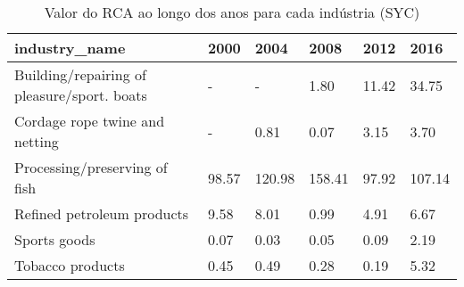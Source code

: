 \begin{table}
\centering
\caption{Valor do RCA ao longo dos anos para cada indústria (SYC)}
\begin{tabular}{p{6cm}p{1.5cm}p{1.5cm}p{1.5cm}p{1.5cm}p{1.5cm}}
\toprule
                              industry\_name &  2000 &   2004 &   2008 &  2012 &   2016 \\
\midrule
Building/repairing of pleasure/sport. boats &     - &      - &   1.80 & 11.42 &  34.75 \\
             Cordage rope twine and netting &     - &   0.81 &   0.07 &  3.15 &   3.70 \\
              Processing/preserving of fish & 98.57 & 120.98 & 158.41 & 97.92 & 107.14 \\
                 Refined petroleum products &  9.58 &   8.01 &   0.99 &  4.91 &   6.67 \\
                               Sports goods &  0.07 &   0.03 &   0.05 &  0.09 &   2.19 \\
                           Tobacco products &  0.45 &   0.49 &   0.28 &  0.19 &   5.32 \\
\bottomrule
\end{tabular}
\end{table}
